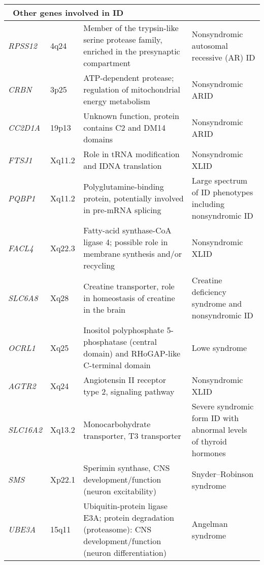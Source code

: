 {\begin{landscape}
\begin{spacing}{0.7}
\begin{longtable}{p{1in} p{1in} p{4.25in} p{2.75in}}
    \multicolumn{4}{l}{\bfseries~Other genes involved in ID} \\ \midrule
	\textit{RPSS12} & 4q24 & Member of the trypsin-like serine protease family, enriched in the presynaptic compartment & Nonsyndromic autosomal recessive (AR) ID \\ \midrule
	\textit{CRBN} & 3p25 & ATP-dependent protease; regulation of mitochondrial energy metabolism & Nonsyndromic ARID \\ \midrule
	\textit{CC2D1A} & 19p13 & Unknown function, protein contains C2 and DM14 domains & Nonsyndromic ARID \\ \midrule
	\textit{FTSJ1} & Xq11.2 & Role in tRNA modification and IDNA translation & Nonsyndromic XLID \\ \midrule
	\textit{PQBP1} & Xq11.2 & Polyglutamine-binding protein, potentially involved in pre-mRNA splicing & Large spectrum of ID phenotypes including nonsyndromic ID \\ \midrule
	\textit{FACL4} & Xq22.3 & Fatty-acid synthase-CoA ligase 4; possible role in membrane synthesis and/or recycling & Nonsyndromic XLID \\ \midrule
	\textit{SLC6A8} & Xq28 & Creatine transporter, role in homeostasis of creatine in the brain & Creatine deficiency syndrome and nonsyndromic ID \\ \midrule
	\textit{OCRL1} & Xq25 & Inositol polyphosphate 5-phosphatase (central domain) and RHoGAP-like C-terminal domain & Lowe syndrome \\ \midrule
	\textit{AGTR2} & Xq24 & Angiotensin II receptor type 2, signaling pathway & Nonsyndromic XLID \\ \midrule
	\textit{SLC16A2} & Xq13.2 & Monocarbohydrate transporter, T3 transporter & Severe syndromic form ID with abnormal levels of thyroid hormones \\ \midrule
	\textit{SMS} & Xp22.1 & Sperimin synthase, CNS development/function (neuron excitability) & Snyder–Robinson syndrome \\ \midrule
	\textit{UBE3A} & 15q11 & Ubiquitin-protein ligase E3A; protein degradation (proteasome): CNS development/function (neuron differentiation) & Angelman syndrome \\
		\end{longtable}
        \end{spacing}
	\end{landscape}
\clearpage%
}